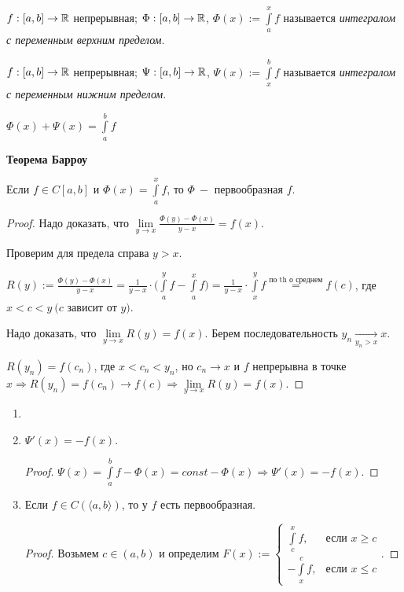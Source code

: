 \begin{definition}
    $f:[a, b]\rightarrow \mathbb{R}$ непрерывная; $\Phi:[a, b]\rightarrow \mathbb{R}$, $\Phi(x):=\int\limits_a^x f$ называется \textit{интегралом с переменным верхним пределом}.
\end{definition}

\begin{definition}
    $f:[a, b]\rightarrow \mathbb{R}$ непрерывная; $\Psi:[a, b]\rightarrow \mathbb{R}$, $\Psi(x):=\int\limits_x^b f$ называется \textit{интегралом с переменным нижним пределом}.
\end{definition}

\begin{remark}
    $\Phi(x)+\Psi(x)=\int\limits_a^b f$
\end{remark}

\begin{theorem}
    \textbf{Теорема Барроу}

    Если $f\in C[a, b]$ и $\Phi(x)=\int\limits_a^x f$, то $\Phi\ -$ первообразная $f$.
\end{theorem}

\begin{proof}
    Надо доказать, что $\lim \limits_{y\rightarrow x}\frac{\Phi(y)-\Phi(x)}{y-x}=f(x)$.

    Проверим для предела справа $y>x$. 
    
    $R(y):=\frac{\Phi(y)-\Phi(x)}{y-x}=\frac{1}{y-x}\cdot \bigg(\int\limits_a^y f - \int\limits_a^x f \bigg)=\frac{1}{y-x}\cdot \int\limits_x^y f\overset{\text{по th о среднем}}{=} f(c)$, где $x<c<y\ (c$ зависит от $y)$.

    Надо доказать, что $\lim\limits_{y\rightarrow x} R(y)=f(x)$. Берем последовательность $y_n\underset{y_n>x}{\rightarrow} x$.

    $R(y_n)=f(c_n)$, где $x<c_n<y_n$, но $ c_n\rightarrow x$ и $f$ непрерывна в точке $x\Rightarrow R(y_n)=f(c_n)\rightarrow f(c)\Rightarrow \lim\limits_{y\rightarrow x} R(y)=f(x)$.
\end{proof}

\begin{corollary}
    \begin{enumerate}
        \item[]
        \item $\Psi'(x)=-f(x)$.
        \begin{proof}
            $\Psi(x)=\int\limits_a^b f-\Phi(x)=const -\Phi(x)\Rightarrow \Psi'(x)=-f(x)$.
        \end{proof}
        \item Если $f\in C(\langle a, b \rangle)$, то у $f$ есть первообразная.
        \begin{proof}
            Возьмем $c\in (a, b)$ и определим $F(x):=\begin{cases} \int\limits_c^x f, &\text{если $x\geq c$} \\
            -\int\limits_x^c f, &\text{если $x\leq c$}
            \end{cases}$.
        \end{proof}
    \end{enumerate}
\end{corollary}

